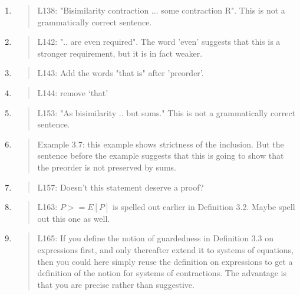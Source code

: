 \begin{enumerate}
\item \begin{quote}
    L138: "Bisimilarity contraction ... some contraction R". This is not a grammatically correct sentence.
  \end{quote}

\item \begin{quote}
    L142: ".. are even required". The word 'even' suggests that this
    is a stronger requirement, but it is in fact weaker.
  \end{quote}

\item \begin{quote}
    L143: Add the words "that is" after 'preorder'.
  \end{quote}

\item \begin{quote}
    L144: remove ‘that’
  \end{quote}

\item \begin{quote}
    L153: "As bisimilarity .. but sums." This is not a grammatically correct sentence.
  \end{quote}

\item \begin{quote}
    Example 3.7: this example shows strictness of the inclusion. But
    the sentence before the example suggests that this is going to
    show that the preorder is not preserved by sums.
  \end{quote}

\item \begin{quote}
    L157: Doesn’t this statement deserve a proof?
  \end{quote}

\item \begin{quote}
    L163: $P >= E[P]$ is spelled out earlier in Definition 3.2. Maybe spell out this one as well.
  \end{quote}

\item \begin{quote}
    L165: If you define the notion of guardedness in Definition 3.3 on
    expressions first, and only thereafter extend it to systems of
    equations, then you could here simply reuse the definition on
    expressions to get a definition of the notion for systems of
    contractions. The advantage is that you are precise rather than
    suggestive.
  \end{quote}


\end{enumerate}
